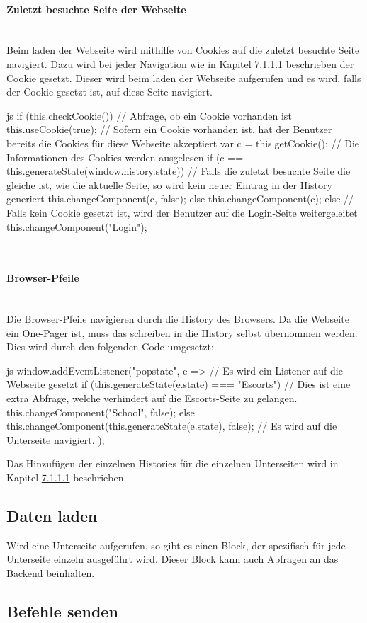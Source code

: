 \paragraph{Zuletzt besuchte Seite der Webseite}~\\
Beim laden der Webseite wird mithilfe von Cookies auf die zuletzt besuchte Seite navigiert. Dazu wird bei jeder Navigation wie in Kapitel \hyperref[sec:navigation]{7.1.1.1} beschrieben der Cookie gesetzt. Dieser wird beim laden der Webseite aufgerufen und es wird, falls der Cookie gesetzt ist, auf diese Seite navigiert.
\begin{code}{js}
	if (this.checkCookie()) {		// Abfrage, ob ein Cookie vorhanden ist
		this.useCookie(true);		// Sofern ein Cookie vorhanden ist, hat der Benutzer bereits die Cookies für diese Webseite akzeptiert
		var c = this.getCookie();	// Die Informationen des Cookies werden ausgelesen
		if (c == this.generateState(window.history.state)) {	// Falls die zuletzt besuchte Seite die gleiche ist, wie die aktuelle Seite, so wird kein neuer Eintrag in der History generiert
			this.changeComponent(c, false);
		} else {
			this.changeComponent(c);
		}
	} else {
		// Falls kein Cookie gesetzt ist, wird der Benutzer auf die Login-Seite weitergeleitet
		this.changeComponent("Login");
	}
\end{code}
~\\

\paragraph{Browser-Pfeile}~\\
Die Browser-Pfeile navigieren durch die History des Browsers. Da die Webseite ein One-Pager ist, muss das schreiben in die History selbst übernommen werden. Dies wird durch den folgenden Code umgesetzt:
\begin{code}{js}
window.addEventListener("popstate", e => {			// Es wird ein Listener auf die Webseite gesetzt
	if (this.generateState(e.state) === "Escorts") {	// Dies ist eine  extra Abfrage, welche verhindert auf die Escorts-Seite zu gelangen.
		this.changeComponent("School", false);
	} else {
		this.changeComponent(this.generateState(e.state), false);	// Es wird auf die Unterseite navigiert.
	}
});
\end{code}
Das Hinzufügen der einzelnen Histories für die einzelnen Unterseiten wird in Kapitel \hyperref[sec:navigation]{7.1.1.1} beschrieben.
\newpage
\subsection{Daten laden}
Wird eine Unterseite aufgerufen, so gibt es einen Block, der spezifisch für jede Unterseite einzeln ausgeführt wird. Dieser Block kann auch Abfragen an das Backend beinhalten.

\subsection{Befehle senden}
